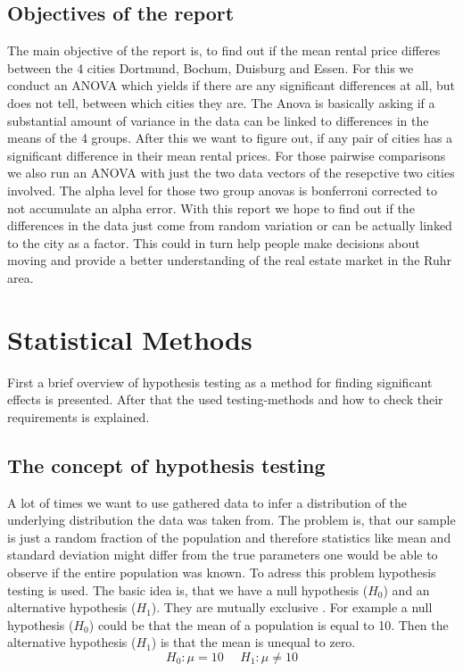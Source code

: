 \documentclass[12 pt]{scrartcl}
\begin{document}
\subsection{Objectives of the report}

The main objective of the report is, to find out if the mean rental price differes between the 4 cities Dortmund, Bochum, Duisburg and Essen. For this we conduct an ANOVA which yields if there are any significant differences at all, but does not tell, between which cities they are. The Anova is basically asking if a substantial amount of variance in the data can be linked to differences in the means of the 4 groups.
After this we want to figure out, if any pair of cities has a significant difference in their mean rental prices. For those pairwise comparisons we also run an ANOVA with just the two data vectors of the resepctive two cities involved. The alpha level for those two group anovas is bonferroni corrected to not accumulate an alpha error.
With this report we hope to find out if the differences in the data just come from random variation or can be actually linked to the city as a factor. This could in turn help people make decisions about moving and provide a better understanding of the real estate market in the Ruhr area.

\section{Statistical Methods}

First a brief overview of hypothesis testing as a method for finding significant effects is presented. After that the used testing-methods and how to check their requirements is explained.

\subsection{The concept of hypothesis testing}

A lot of times we want to use gathered data to infer a distribution of the underlying distribution the data was taken from. The problem is, that our sample is just a random fraction of the population and therefore statistics like mean and standard deviation might differ from the true parameters one would be able to observe if the entire population was known.
To adress this problem hypothesis testing is used. The basic idea is, that we have a null hypothesis ($H_0$) and an alternative hypothesis ($H_1$). They are mutually exclusive \citep[p.~218]{eid2017statistik}.
For example a null hypothesis ($H_0$) could be that the mean of a population is equal to 10. Then the alternative hypothesis ($H_1$) is that the mean is unequal to zero.
\[ H_0: \mu = 10  \ \ \ \ \ \   H_1: \mu \neq 10 \]
\end{document}
